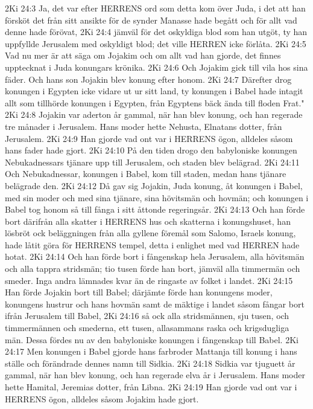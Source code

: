 2Ki 24:3  Ja, det var efter HERRENS ord som detta kom över Juda, i det att han försköt det från sitt ansikte för de synder Manasse hade begått och för allt vad denne hade förövat,
2Ki 24:4  jämväl för det oskyldiga blod som han utgöt, ty han uppfyllde Jerusalem med oskyldigt blod; det ville HERREN icke förlåta.
2Ki 24:5  Vad nu mer är att säga om Jojakim och om allt vad han gjorde, det finnes upptecknat i Juda konungars krönika.
2Ki 24:6  Och Jojakim gick till vila hos sina fäder. Och hans son Jojakin blev konung efter honom.
2Ki 24:7  Därefter drog konungen i Egypten icke vidare ut ur sitt land, ty konungen i Babel hade intagit allt som tillhörde konungen i Egypten, från Egyptens bäck ända till floden Frat."
2Ki 24:8  Jojakin var aderton år gammal, när han blev konung, och han regerade tre månader i Jerusalem. Hans moder hette Nehusta, Elnatans dotter, från Jerusalem.
2Ki 24:9  Han gjorde vad ont var i HERRENS ögon, alldeles såsom hans fader hade gjort.
2Ki 24:10  På den tiden drogo den babyloniske konungen Nebukadnessars tjänare upp till Jerusalem, och staden blev belägrad.
2Ki 24:11  Och Nebukadnessar, konungen i Babel, kom till staden, medan hans tjänare belägrade den.
2Ki 24:12  Då gav sig Jojakin, Juda konung, åt konungen i Babel, med sin moder och med sina tjänare, sina hövitsmän och hovmän; och konungen i Babel tog honom så till fånga i sitt åttonde regeringsår.
2Ki 24:13  Och han förde bort därifrån alla skatter i HERRENS hus och skatterna i konungshuset, han lösbröt ock beläggningen från alla gyllene föremål som Salomo, Israels konung, hade låtit göra för HERRENS tempel, detta i enlighet med vad HERREN hade hotat.
2Ki 24:14  Och han förde bort i fångenskap hela Jerusalem, alla hövitsmän och alla tappra stridsmän; tio tusen förde han bort, jämväl alla timmermän och smeder. Inga andra lämnades kvar än de ringaste av folket i landet.
2Ki 24:15  Han förde Jojakin bort till Babel; därjämte förde han konungens moder, konungens hustrur och hans hovmän samt de mäktige i landet såsom fångar bort ifrån Jerusalem till Babel,
2Ki 24:16  så ock alla stridsmännen, sju tusen, och timmermännen och smederna, ett tusen, allasammans raska och krigsdugliga män. Dessa fördes nu av den babyloniske konungen i fångenskap till Babel.
2Ki 24:17  Men konungen i Babel gjorde hans farbroder Mattanja till konung i hans ställe och förändrade dennes namn till Sidkia.
2Ki 24:18  Sidkia var tjuguett år gammal, när han blev konung, och han regerade elva år i Jerusalem. Hans moder hette Hamital, Jeremias dotter, från Libna.
2Ki 24:19  Han gjorde vad ont var i HERRENS ögon, alldeles såsom Jojakim hade gjort.
